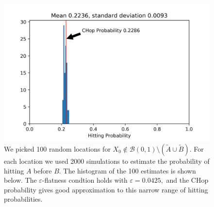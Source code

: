 \begin{figure}
	\caption{\label{fig:simple_hitting_prob_test} We picked 100 random locations for $ X_0 \not\in \mathcal{B}(0, 1) \setminus (\tilde{A} \cup \tilde{B})$. For each location we used 2000 simulations to estimate the probability of hitting $A$ before $B$. The histogram of the 100 estimates is shown below. The $\varepsilon$-flatness condtion holds with $\varepsilon = 0.0425,$ and the CHop probability gives good approximation to this narrow range of hitting probabilities.}
	\includegraphics{figs/simple_hitting_prob_hist.png}
\end{figure}

